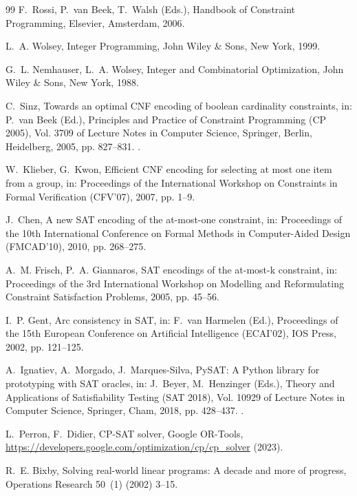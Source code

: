\documentclass[a4paper,fleqn]{cas-sc}
\begin{document}
\begin{thebibliography}{99}
F.~Rossi, P.~van Beek, T.~Walsh (Eds.), Handbook of Constraint Programming, Elsevier, Amsterdam, 2006.

L.~A. Wolsey, Integer Programming, John Wiley \& Sons, New York, 1999.

G.~L. Nemhauser, L.~A. Wolsey, Integer and Combinatorial Optimization, John Wiley \& Sons, New York, 1988.

C.~Sinz, Towards an optimal CNF encoding of boolean cardinality constraints, in: P.~van Beek (Ed.), Principles and Practice of Constraint Programming (CP 2005), Vol. 3709 of Lecture Notes in Computer Science, Springer, Berlin, Heidelberg, 2005, pp. 827--831.
\newblock \href {https://doi.org/10.1007/11564751_73} {}.

W.~Klieber, G.~Kwon, Efficient CNF encoding for selecting at most one item from a group, in: Proceedings of the International Workshop on Constraints in Formal Verification (CFV'07), 2007, pp. 1--9.

J.~Chen, A new SAT encoding of the at-most-one constraint, in: Proceedings of the 10th International Conference on Formal Methods in Computer-Aided Design (FMCAD'10), 2010, pp. 268--275.

A.~M. Frisch, P.~A. Giannaros, SAT encodings of the at-most-k constraint, in: Proceedings of the 3rd International Workshop on Modelling and Reformulating Constraint Satisfaction Problems, 2005, pp. 45--56.

I.~P. Gent, Arc consistency in SAT, in: F.~van Harmelen (Ed.), Proceedings of the 15th European Conference on Artificial Intelligence (ECAI'02), IOS Press, 2002, pp. 121--125.

A.~Ignatiev, A.~Morgado, J.~Marques-Silva, PySAT: A Python library for prototyping with SAT oracles, in: J.~Beyer, M.~Henzinger (Eds.), Theory and Applications of Satisfiability Testing (SAT 2018), Vol. 10929 of Lecture Notes in Computer Science, Springer, Cham, 2018, pp. 428--437.
\newblock \href {https://doi.org/10.1007/978-3-319-94144-8_26} {}.

L.~Perron, F.~Didier, CP-SAT solver, Google OR-Tools, \url{https://developers.google.com/optimization/cp/cp_solver} (2023).

R.~E. Bixby, Solving real-world linear programs: A decade and more of progress, Operations Research 50~(1) (2002) 3--15.


\end{thebibliography}
\end{document}
